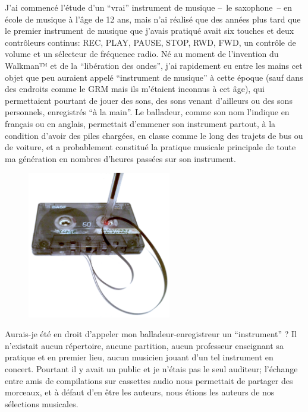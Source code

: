 \noindent J'ai commencé l'étude d'un ``vrai'' instrument de musique --~le saxophone~-- en école de musique à l'âge de 12 ans, mais n'ai réalisé que des années plus tard que le premier instrument de musique que j'avais pratiqué avait six touches et deux contrôleurs continus: REC, PLAY, PAUSE, STOP, RWD, FWD, un contrôle de volume et un sélecteur de fréquence radio. Né au moment de l'invention du Walkman™ et de la ``libération des ondes'', j'ai rapidement eu entre les mains cet objet que peu auraient appelé ``instrument de musique'' à cette époque (sauf  dans des endroits comme le \gls{GRM} mais ils m'étaient inconnus à cet âge), qui permettaient pourtant de jouer des sons, des sons venant d'ailleurs ou des sons personnels, enregistrés ``à la main''. Le balladeur, comme son nom l'indique en français ou en anglais, permettait d'emmener son instrument partout, à la condition d'avoir des piles chargées, en classe comme le long des trajets de bus ou de voiture, et a probablement constitué la pratique musicale principale de toute ma génération en nombres d'heures passées sur son instrument.
\begin{figure}
	\vspace{-6.2em}
	\captionsetup{format=plain}
	\centering
 	\includegraphics[width=0.56\textwidth]{gfx/01_preamble/K7.png}
 	\label{fig:preamble:walkman}
\end{figure}
\par
\indent Aurais-je été en droit d'appeler mon balladeur-enregistreur un ``instrument'' ? Il n'existait aucun répertoire, aucune partition, aucun professeur enseignant sa pratique et en premier lieu, aucun musicien jouant d'un tel instrument en concert. Pourtant il y avait un public et je n'étais pas le seul auditeur; l'échange entre amis de compilations sur cassettes audio nous permettait de partager des morceaux, et à défaut d'en être les auteurs, nous étions les auteurs de nos sélections musicales.\\
